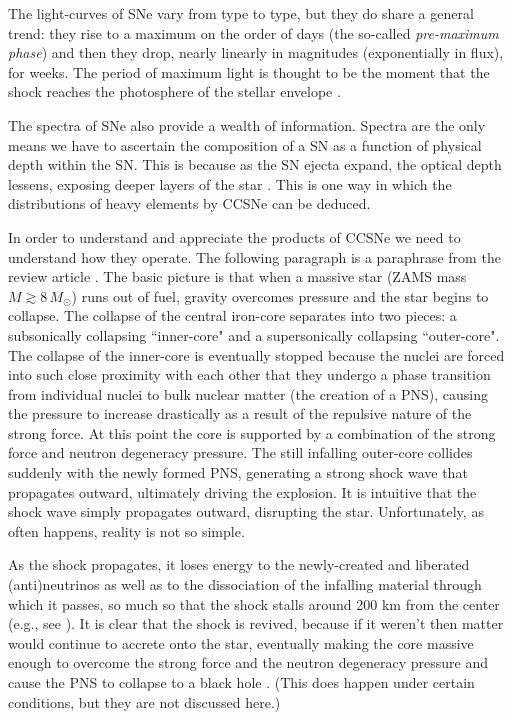 The light-curves of SNe vary from type to type, but they do share a general
trend: they rise to a maximum on the order of days
(the so-called {\it pre-maximum phase}) and then they drop, nearly linearly in
magnitudes (exponentially in flux), for weeks.
The period of maximum light is thought to be the moment that the shock reaches
the photosphere of the stellar envelope \citep{bw2017}.

The spectra of SNe also provide a wealth of information.
Spectra are the only means we have to ascertain the composition of a SN as a
function of physical depth within the SN.
This is because as the SN ejecta expand, the optical depth lessens,
exposing deeper layers of the star \citep{bw2017}.
This is one way in which the distributions of heavy elements by CCSNe can be
deduced.

In order to understand and appreciate the products of CCSNe we need to
understand how they operate.
The following paragraph is a paraphrase from the review article \citet{m2005}.
The basic picture is that when a massive star
(ZAMS mass $M\gtrsim8\,M_{\odot}$) runs out of fuel, gravity overcomes pressure
and the star begins to collapse.
The collapse of the central iron-core separates into two pieces: a subsonically
collapsing ``inner-core" and a supersonically collapsing ``outer-core".
The collapse of the inner-core is eventually stopped because the nuclei are
forced into such close proximity with each other that they undergo a
phase transition from individual nuclei to bulk nuclear matter
(the creation of a PNS),
causing the pressure to increase drastically as a result of the repulsive
nature of the strong force.
At this point the core is supported by a combination of the strong force and
neutron degeneracy pressure.
The still infalling outer-core collides suddenly with the newly formed PNS,
generating a strong shock wave that propagates outward, ultimately driving
the explosion.
It is intuitive that the shock wave simply propagates outward, disrupting
the star.
Unfortunately, as often happens, reality is not so simple.

As the shock propagates, it loses energy to the newly-created and liberated
(anti)neutrinos as well as to the dissociation of the
infalling material through which it passes,
so much so that the shock stalls around 200 km from the center
(e.g., see \citet{hm1981}).
It is clear that the shock is revived, because if it weren't then matter
would continue to accrete onto the star, eventually making the core massive
enough to overcome the strong force and the neutron degeneracy pressure
and cause the PNS to collapse
to a black hole \citep{bw1985}.
(This does happen under certain conditions, but they are not discussed here.)

